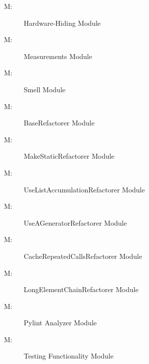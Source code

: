 \documentclass[12pt, titlepage]{article}
\newcounter{mnum}
\newcommand{\mthemnum}{M\themnum}
\begin{document}
\begin{description}
\item [ \mthemnum \label{mHH}:] Hardware-Hiding Module
\item [ \mthemnum \label{mM}:] Measurements Module
\item [ \mthemnum \label{mSmell}:] Smell Module
\item [ \mthemnum \label{mBR}:] BaseRefactorer Module
\item [ \mthemnum \label{mMIMR}:] MakeStaticRefactorer Module
\item [ \mthemnum \label{mSCLR}:] UseListAccumulationRefactorer Module
\item [ \mthemnum \label{mUGENR}:] UseAGeneratorRefactorer Module
\item [ \mthemnum \label{mCRC}:] CacheRepeatedCallsRefactorer Module
\item [ \mthemnum \label{mLEC}:] LongElementChainRefactorer Module
\item [ \mthemnum \label{mPyA}:] Pylint Analyzer Module
\item [ \mthemnum \label{mTest}:] Testing Functionality Module
\end{description}
\end{document}
